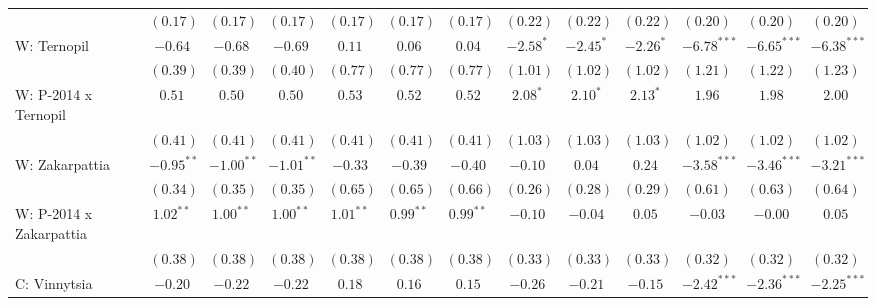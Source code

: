 \begin{table}
\begin{center}
\begin{tiny}
\begin{tabular}{l c c c c c c c c c c c c}
                            & $(0.17)$      & $(0.17)$      & $(0.17)$      & $(0.17)$     & $(0.17)$     & $(0.17)$     & $(0.22)$      & $(0.22)$     & $(0.22)$       & $(0.20)$      & $(0.20)$      & $(0.20)$      \\
W: Ternopil                 & $-0.64$       & $-0.68$       & $-0.69$       & $0.11$       & $0.06$       & $0.04$       & $-2.58^{*}$   & $-2.45^{*}$  & $-2.26^{*}$    & $-6.78^{***}$ & $-6.65^{***}$ & $-6.38^{***}$ \\
                            & $(0.39)$      & $(0.39)$      & $(0.40)$      & $(0.77)$     & $(0.77)$     & $(0.77)$     & $(1.01)$      & $(1.02)$     & $(1.02)$       & $(1.21)$      & $(1.22)$      & $(1.23)$      \\
W: P-2014 x Ternopil        & $0.51$        & $0.50$        & $0.50$        & $0.53$       & $0.52$       & $0.52$       & $2.08^{*}$    & $2.10^{*}$   & $2.13^{*}$     & $1.96$        & $1.98$        & $2.00$        \\
                            & $(0.41)$      & $(0.41)$      & $(0.41)$      & $(0.41)$     & $(0.41)$     & $(0.41)$     & $(1.03)$      & $(1.03)$     & $(1.03)$       & $(1.02)$      & $(1.02)$      & $(1.02)$      \\
W: Zakarpattia              & $-0.95^{**}$  & $-1.00^{**}$  & $-1.01^{**}$  & $-0.33$      & $-0.39$      & $-0.40$      & $-0.10$       & $0.04$       & $0.24$         & $-3.58^{***}$ & $-3.46^{***}$ & $-3.21^{***}$ \\
                            & $(0.34)$      & $(0.35)$      & $(0.35)$      & $(0.65)$     & $(0.65)$     & $(0.66)$     & $(0.26)$      & $(0.28)$     & $(0.29)$       & $(0.61)$      & $(0.63)$      & $(0.64)$      \\
W: P-2014 x Zakarpattia     & $1.02^{**}$   & $1.00^{**}$   & $1.00^{**}$   & $1.01^{**}$  & $0.99^{**}$  & $0.99^{**}$  & $-0.10$       & $-0.04$      & $0.05$         & $-0.03$       & $-0.00$       & $0.05$        \\
                            & $(0.38)$      & $(0.38)$      & $(0.38)$      & $(0.38)$     & $(0.38)$     & $(0.38)$     & $(0.33)$      & $(0.33)$     & $(0.33)$       & $(0.32)$      & $(0.32)$      & $(0.32)$      \\
C: Vinnytsia                & $-0.20$       & $-0.22$       & $-0.22$       & $0.18$       & $0.16$       & $0.15$       & $-0.26$       & $-0.21$      & $-0.15$        & $-2.42^{***}$ & $-2.36^{***}$ & $-2.25^{***}$ \\

\end{tabular}
\end{tiny}
\end{center}
\end{table}
